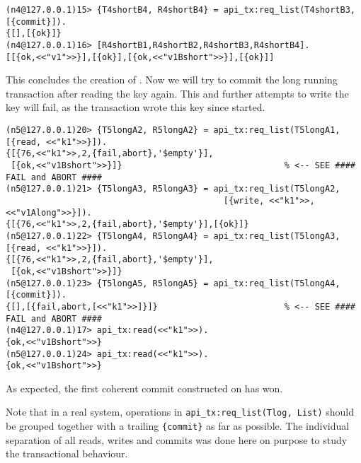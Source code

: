 \begin{lstlisting}
(n4@127.0.0.1)15> {T4shortB4, R4shortB4} = api_tx:req_list(T4shortB3, [{commit}]).
{[],[{ok}]}
(n4@127.0.0.1)16> [R4shortB1,R4shortB2,R4shortB3,R4shortB4].
[[{ok,<<"v1">>}],[{ok}],[{ok,<<"v1Bshort">>}],[{ok}]]
\end{lstlisting}
This concludes the creation of . Now we will try to commit the long
running transaction  after reading the key  again. This and
further attempts to write the key will fail, as the transaction 
wrote this key since  started.
\begin{lstlisting}
(n5@127.0.0.1)20> {T5longA2, R5longA2} = api_tx:req_list(T5longA1, [{read, <<"k1">>}]).
{[{76,<<"k1">>,2,{fail,abort},'$empty'}],
 [{ok,<<"v1Bshort">>}]}                                % <-- SEE #### FAIL and ABORT ####
(n5@127.0.0.1)21> {T5longA3, R5longA3} = api_tx:req_list(T5longA2,
                                           [{write, <<"k1">>,<<"v1Along">>}]).
{[{76,<<"k1">>,2,{fail,abort},'$empty'}],[{ok}]}
(n5@127.0.0.1)22> {T5longA4, R5longA4} = api_tx:req_list(T5longA3, [{read, <<"k1">>}]).
{[{76,<<"k1">>,2,{fail,abort},'$empty'}],
 [{ok,<<"v1Bshort">>}]}
(n5@127.0.0.1)23> {T5longA5, R5longA5} = api_tx:req_list(T5longA4, [{commit}]).
{[],[{fail,abort,[<<"k1">>]}]}                         % <-- SEE #### FAIL and ABORT ####
(n4@127.0.0.1)17> api_tx:read(<<"k1">>).
{ok,<<"v1Bshort">>}
(n5@127.0.0.1)24> api_tx:read(<<"k1">>).
{ok,<<"v1Bshort">>}
\end{lstlisting}

As expected, the first coherent commit  constructed on  has
won.

Note that in a real system, operations in \lstinline|api_tx:req_list(Tlog, List)| should be grouped together with a trailing \lstinline|{commit}| as
far as possible. The individual separation of all reads, writes and commits
was done here on purpose to study the transactional behaviour.
